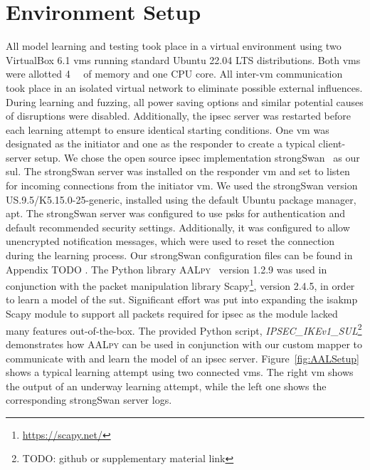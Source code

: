 \section{Environment Setup} \label{sec:env}
All model learning and testing took place in a virtual environment using two VirtualBox 6.1 \acp{vm} running standard Ubuntu 22.04 LTS distributions. Both \acp{vm} were allotted \SI{4}{\giga\byte} of memory and one CPU core. All inter-\ac{vm} communication took place in an isolated virtual network to eliminate possible external influences. During learning and fuzzing, all power saving options and similar potential causes of disruptions were disabled. Additionally, the \ac{ipsec} server was restarted before each learning attempt to ensure identical starting conditions. One \ac{vm} was designated as the initiator and one as the responder to create a typical client-server setup. We chose the open source \ac{ipsec} implementation strongSwan~\cite{software:strongSwan} as our \ac{sul}. The strongSwan server was installed on the responder \ac{vm} and set to listen for incoming connections from the initiator \ac{vm}. We used the strongSwan version US.9.5/K5.15.0-25-generic, installed using the default Ubuntu package manager, apt. The strongSwan server was configured to use \acp{psk} for authentication and default recommended security settings. Additionally, it was configured to allow unencrypted notification messages, which were used to reset the connection during the learning process. Our strongSwan configuration files can be found in Appendix TODO . The Python library \textsc{AALpy}~\cite{software:aalpy} version 1.2.9 was used in conjunction with the packet manipulation library Scapy\footnote{\url{https://scapy.net/}}, version 2.4.5, in order to learn a model of the \ac{sut}. Significant effort was put into expanding the \ac{isakmp} Scapy module to support all packets required for \ac{ipsec} as the module lacked many features out-of-the-box. The provided Python script, \emph{IPSEC\_IKEv1\_SUL}\footnote{TODO: github or supplementary material link} demonstrates how \textsc{AALpy} can be used in conjunction with our custom mapper to communicate with and learn the model of an \ac{ipsec} server. Figure~\ref{fig:AALSetup} shows a typical learning attempt using two connected \acp{vm}. The right \ac{vm} shows the output of an underway learning attempt, while the left one shows the corresponding strongSwan server logs.
\fi

